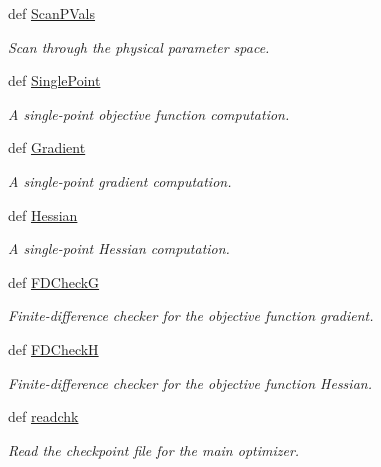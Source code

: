 \begin{DoxyCompactItemize}
def \hyperlink{classforcebalance_1_1optimizer_1_1Optimizer_a70bff76f2e56d87c8dee8aa92fe56d29}{Scan\-P\-Vals}
\begin{DoxyCompactList}\small\item\em Scan through the physical parameter space. \end{DoxyCompactList}\item 
def \hyperlink{classforcebalance_1_1optimizer_1_1Optimizer_a1477d2b88faa1d4991418538133abcff}{Single\-Point}
\begin{DoxyCompactList}\small\item\em A single-\/point objective function computation. \end{DoxyCompactList}\item 
def \hyperlink{classforcebalance_1_1optimizer_1_1Optimizer_ac5adf24cf3ea3976eb67f75b6b89d101}{Gradient}
\begin{DoxyCompactList}\small\item\em A single-\/point gradient computation. \end{DoxyCompactList}\item 
def \hyperlink{classforcebalance_1_1optimizer_1_1Optimizer_a0c16ad8678a6480e235a45d69fb077d3}{Hessian}
\begin{DoxyCompactList}\small\item\em A single-\/point Hessian computation. \end{DoxyCompactList}\item 
def \hyperlink{classforcebalance_1_1optimizer_1_1Optimizer_aacf96d137fb0e491af7e380c8bd61eb9}{F\-D\-Check\-G}
\begin{DoxyCompactList}\small\item\em Finite-\/difference checker for the objective function gradient. \end{DoxyCompactList}\item 
def \hyperlink{classforcebalance_1_1optimizer_1_1Optimizer_adb86c1f6580bb088a23563a6103986fe}{F\-D\-Check\-H}
\begin{DoxyCompactList}\small\item\em Finite-\/difference checker for the objective function Hessian. \end{DoxyCompactList}\item 
def \hyperlink{classforcebalance_1_1optimizer_1_1Optimizer_a05ee5fe985b3e2ec71071ca061e42d66}{readchk}
\begin{DoxyCompactList}\small\item\em Read the checkpoint file for the main optimizer. \end{DoxyCompactList}\item 

\end{DoxyCompactItemize}
